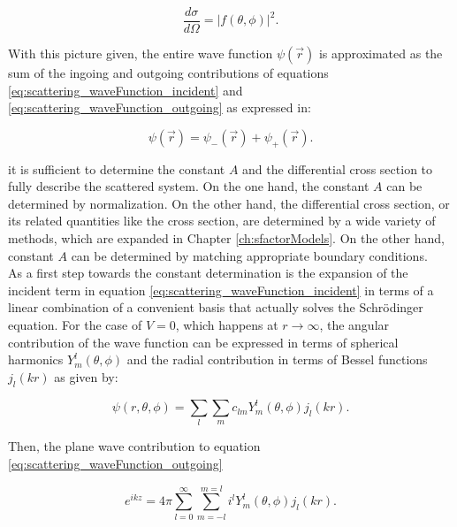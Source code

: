 \documentclass[openany]{book}
\begin{document}
\begin{equation}  \label{eq:scattering_diffCrossSection}
	\frac{d\sigma}{d\Omega} = |f(\theta, \phi)|^2.
\end{equation}

With this picture given, the entire wave function $\psi(\vec r)$ is approximated as the sum of the ingoing and outgoing contributions of equations \ref{eq:scattering_waveFunction_incident} and  \ref{eq:scattering_waveFunction_outgoing} as expressed in: 

\begin{equation} \label{eq:scattering_waveFunction_ansatz}
	\psi(\vec r) = 	\psi_{-}(\vec r) + \psi_{+}(\vec r).
\end{equation}

it is sufficient to determine the constant $A$ and the differential cross section to fully describe the scattered system. On the one hand, the constant $A$ can be determined by normalization. On the other hand, the differential cross section, or its related quantities like the cross section, are determined by a wide variety of methods, which are expanded in Chapter \ref{ch:sfactorModels}. On the other hand, constant $A$ can be determined by matching appropriate boundary conditions. \\

As a first step towards the constant determination is the expansion of the incident term in equation \ref{eq:scattering_waveFunction_incident} in terms of a linear combination of a convenient basis that actually solves the Schrödinger equation. For the case of $V = 0$, which happens at $r \rightarrow \infty$, the angular contribution of the wave function can be expressed in terms of spherical harmonics $Y_{m}^{l}(\theta, \phi)$ and the radial contribution in terms of Bessel functions $j_l(kr)$ as given by:

\begin{equation}   \label{eq:partialWaveExpansion_definition}
	\psi(r, \theta, \phi) =  \sum_{l} \sum_{m} {c_{lm}Y_{m}^{l}(\theta, \phi)j_l(kr)}.
\end{equation}

Then, the plane wave contribution to equation \ref{eq:scattering_waveFunction_outgoing}

\begin{equation} \label{eq:scattering_planeWave_expansion}
	e^{ikz} = 4\pi  \sum_{l = 0}^{\infty}  \sum_{m = -l}^{m=l} { i^l Y^{l}_{m}(\theta, \phi) j_l(kr)}.
\end{equation}
\end{document}
